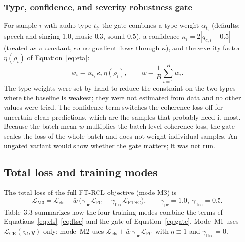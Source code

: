 \documentclass[12pt,a4paper]{report}
\begin{document}
\subsubsection{Type, confidence, and severity robustness gate}

For sample $i$ with audio type $t_i$, the gate combines a type weight $\alpha_{t_i}$ (defaults: speech and singing $1.0$, music $0.3$, sound $0.5$), a confidence $\kappa_i = 2|q_{c,i} - 0.5|$ (treated as a constant, so no gradient flows through $\kappa$), and the severity factor $\eta(\rho_i)$ of Equation~\eqref{eq:eta}:
\begin{equation}
w_i = \alpha_{t_i}\,\kappa_i\,\eta(\rho_i), \qquad \bar{w} = \frac{1}{B}\sum_{i=1}^{B} w_i .
\label{eq:gate}
\end{equation}
The type weights were set by hand to reduce the constraint on the two types where the baseline is weakest; they were not estimated from data and no other values were tried. The confidence term switches the coherence loss off for uncertain clean predictions, which are the samples that probably need it most. Because the batch mean $\bar w$ multiplies the batch-level coherence loss, the gate scales the loss of the whole batch and does not weight individual samples. An ungated variant would show whether the gate matters; it was not run.

\subsection{Total loss and training modes}

The total loss of the full FT-RCL objective (mode M3) is
\begin{equation}
\mathcal{L}_{\mathrm{M3}} = \mathcal{L}_{\mathrm{cls}} + \bar{w}\,\Big(\gamma_{\mathrm{pc}}\mathcal{L}_{\mathrm{PC}} + \gamma_{\mathrm{ftsc}}\mathcal{L}_{\mathrm{FTSC}}\Big), \qquad \gamma_{\mathrm{pc}} = 1.0,\ \gamma_{\mathrm{ftsc}} = 0.5 .
\label{eq:m3}
\end{equation}
Table~3.3 summarizes how the four training modes combine the terms of Equations~\eqref{eq:cls}--\eqref{eq:ftsc} and the gate of Equation~\eqref{eq:gate}. Mode~M1 uses $\mathcal{L}_{\mathrm{CE}}(z_d,y)$ only; mode~M2 uses $\mathcal{L}_{\mathrm{cls}} + \bar{w}\,\gamma_{\mathrm{pc}}\mathcal{L}_{\mathrm{PC}}$ with $\eta \equiv 1$ and $\gamma_{\mathrm{ftsc}} = 0$.
\end{document}
